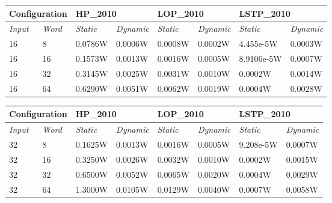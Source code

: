 \begin{table}[b!]
\centering
\label{my-label}
\begin{tabular}{@{}llllllll@{}}
\toprule
\multicolumn{2}{l}{\textbf{Configuration}} & \multicolumn{2}{l}{\textbf{HP\_2010}} & \multicolumn{2}{l}{\textbf{LOP\_2010}} & \multicolumn{2}{l}{\textbf{LSTP\_2010}} \\ \midrule
\textit{Input}         & \textit{Word}        & \textit{Static}   & \textit{Dynamic}  & \textit{Static}   & \textit{Dynamic}   & \textit{Static}    & \textit{Dynamic}   \\
16                     & 8                 & 0.0786W            & 0.0006W            & 0.0008W            & 0.0002W             & 4.455e-5W           & 0.0003W             \\
16                     & 16                & 0.1573W            & 0.0013W            & 0.0016W            & 0.0005W             & 8.9106e-5W          & 0.0007W             \\
16                     & 32                & 0.3145W            & 0.0025W            & 0.0031W            & 0.0010W             & 0.0002W             & 0.0014W             \\
16                     & 64                & 0.6290W            & 0.0051W            & 0.0062W            & 0.0019W             & 0.0004W             & 0.0028W            
\end{tabular}
\end{table}
\begin{table}[b!]
\centering
\label{my-label}
\begin{tabular}{@{}llllllll@{}}
\toprule
\multicolumn{2}{l}{\textbf{Configuration}} & \multicolumn{2}{l}{\textbf{HP\_2010}} & \multicolumn{2}{l}{\textbf{LOP\_2010}} & \multicolumn{2}{l}{\textbf{LSTP\_2010}} \\ \midrule
\textit{Input}         & \textit{Word}        & \textit{Static}   & \textit{Dynamic}  & \textit{Static}   & \textit{Dynamic}   & \textit{Static}    & \textit{Dynamic}   \\
32                     & 8                 & 0.1625W            & 0.0013W            & 0.0016W            & 0.0005W             & 9.208e-5W           & 0.0007W             \\
32                     & 16                & 0.3250W            & 0.0026W            & 0.0032W            & 0.0010W             & 0.0002W             & 0.0015W             \\
32                     & 32                & 0.6500W            & 0.0052W            & 0.0065W            & 0.0020W             & 0.0004W             & 0.0029W             \\
32                     & 64                & 1.3000W            & 0.0105W            & 0.0129W            & 0.0040W             & 0.0007W             & 0.0058W            
\end{tabular}
\end{table}
